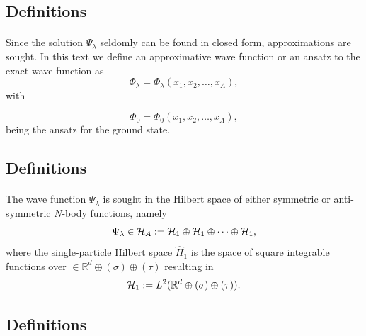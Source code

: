\documentclass[%
twoside,                 %
final,                   %
10pt]{article}
\begin{document}
\subsection*{Definitions}

\paragraph{}
Since the solution $\Psi_{\lambda}$ seldomly can be found in closed form, approximations are sought. In this text we define an approximative wave function or an ansatz to the exact wave function as 
\[
\Phi_{\lambda}=\Phi_{\lambda}(x_1,x_2,\dots,x_A),
\]
with

\[
\Phi_{0}=\Phi_{0}(x_{1},x_{2},\dots,x_{A}),
\]
being the ansatz for the ground state.




\subsection*{Definitions}

\paragraph{}
The wave function $\Psi_{\lambda}$ is sought in the Hilbert space of either symmetric or anti-symmetric $N$-body functions, namely
\[
\Psi_{\lambda}\in {\cal H}_A:= {\cal H}_1\oplus{\cal H}_1\oplus\dots\oplus{\cal H}_1,
\]
where the single-particle Hilbert space $\hat{H}_1$ is the space of square integrable functions over $\in {\mathbb{R}}^{d}\oplus (\sigma)\oplus (\tau)$ resulting in
\[
{\cal H}_1:= L^2(\mathbb{R}^{d}\oplus (\sigma)\oplus (\tau)).
\]





\subsection*{Definitions}

\end{document}
